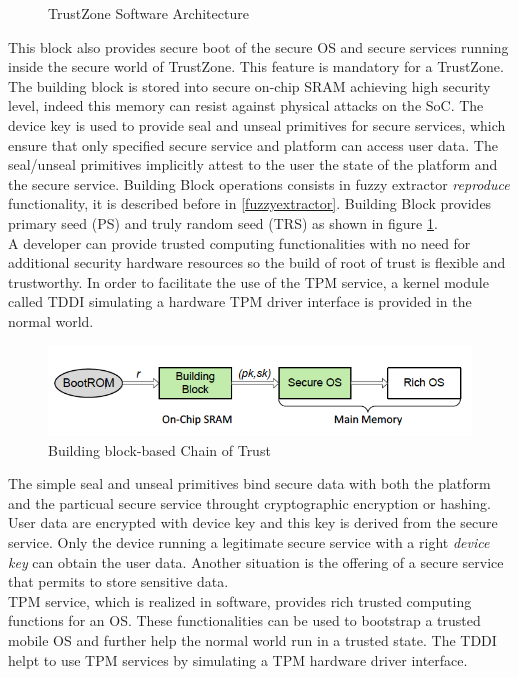 \documentclass[../tesi.tex]{subfiles}
\begin{document}
{\begin{figure}
\caption{TrustZone Software Architecture}
\label{fig:zhaotee}
\end{figure}
This block also provides secure boot of the secure OS and secure services running inside the secure world of TrustZone. This feature is mandatory for a TrustZone. The building block is stored into secure on-chip SRAM achieving high security level, indeed this memory can resist against physical attacks on the SoC. The device key is used to provide seal and unseal primitives for secure services, which ensure that only specified secure service and platform can access user data. The seal/unseal primitives implicitly attest to the user the state of the platform and the secure service. Building Block operations consists in fuzzy extractor \emph{reproduce} functionality, it is described before in \ref{fuzzyextractor}. Building Block provides primary seed (PS) and truly random seed (TRS) as shown in figure \ref{fig:zhaotee}. \\
A developer can provide trusted computing functionalities with no need for additional security hardware resources so the build of root of trust is flexible and trustworthy. In order to facilitate the use of the TPM service, a kernel module called TDDI simulating a hardware TPM driver interface is provided in the normal world.
\begin{figure}
\centering
\includegraphics[scale=0.40]{images/zhaochainoftrust.png}
\caption{Building block-based Chain of Trust}
\label{fig:zhaochainoftrust}
\end{figure}
The simple seal and unseal primitives bind secure data with both the platform and the particual secure service throught cryptographic encryption or hashing. User data are encrypted with device key and this key is derived from the secure service. Only the device running a legitimate secure service with a right \emph{device key} can obtain the user data. Another situation is the offering of a secure service that permits to store sensitive data. \\
TPM service, which is realized in software, provides rich trusted computing functions for an OS. These functionalities can be used to bootstrap a trusted mobile OS and further help the normal world run in a trusted state. The TDDI helpt to use TPM services by simulating a TPM hardware driver interface. \\
}
\end{document}
